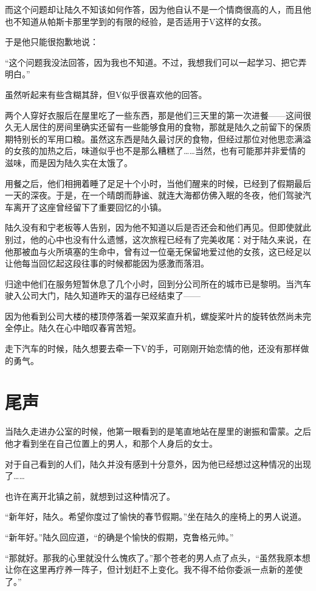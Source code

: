 而这个问题却让陆久不知该如何作答，因为他自认不是一个情商很高的人，而且他也不知道从帕斯卡那里学到的有限的经验，是否适用于V这样的女孩。

于是他只能很抱歉地说：

“这个问题我没法回答，因为我也不知道。不过，我想我们可以一起学习、把它弄明白。”

虽然听起来有些含糊其辞，但V似乎很喜欢他的回答。

两个人穿好衣服后在屋里吃了一些东西，那是他们三天里的第一次进餐——这间很久无人居住的房间里确实还留有一些能够食用的食物，那就是陆久之前留下的保质期特别长的军用口粮。虽然这东西是陆久最讨厌的食物，但经过那位对他思恋满溢的女孩的加热之后，味道似乎也不是那么糟糕了……当然，也有可能那并非爱情的滋味，而是因为陆久实在太饿了。

用餐之后，他们相拥着睡了足足十个小时，当他们醒来的时候，已经到了假期最后一天的深夜。于是，在一个晴朗而静谧、就连大海都仿佛入眠的冬夜，他们驾驶汽车离开了这座曾经留下了重要回忆的小镇。

陆久没有和宁老板等人告别，因为他不知道以后是否还会和他们再见。但即使就此别过，他的心中也没有什么遗憾，这次旅程已经有了完美收尾：对于陆久来说，在他那被血与火所填塞的生命中，曾有过一位毫无保留地爱过他的女孩，这已经足以让他每当回忆起这段往事的时候都能因为感激而落泪。

归途中他们在服务短暂休息了几个小时，回到分公司所在的城市已是黎明。当汽车驶入公司大门，陆久知道昨天的温存已经结束了——

因为他看到公司大楼的楼顶停落着一架双桨直升机，螺旋桨叶片的旋转依然尚未完全停止。陆久在心中暗叹春宵苦短。

走下汽车的时候，陆久想要去牵一下V的手，可刚刚开始恋情的他，还没有那样做的勇气。


\section{尾声}

当陆久走进办公室的时候，他第一眼看到的是笔直地站在屋里的谢振和雷蒙。之后他才看到坐在自己位置上的男人，和那个人身后的女士。

对于自己看到的人们，陆久并没有感到十分意外，因为他已经想过这种情况的出现了……

也许在离开北镇之前，就想到过这种情况了。

“新年好，陆久。希望你度过了愉快的春节假期。”坐在陆久的座椅上的男人说道。

“新年好。”陆久回应道，“的确是个愉快的假期，克鲁格元帅。”

“那就好。那我的心里就没什么愧疚了。”那个苍老的男人点了点头，“虽然我原本想让你在这里再疗养一阵子，但计划赶不上变化。我不得不给你委派一点新的差使了。”

